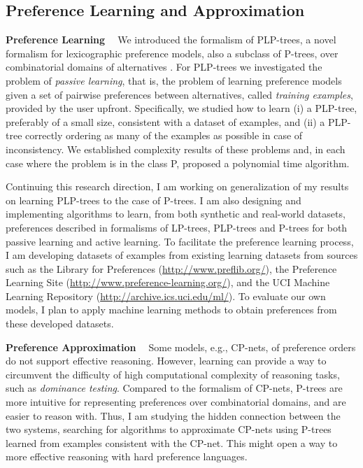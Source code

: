 \documentclass[11pt]{article}
\begin{document}
\subsection{Preference Learning and Approximation}
\smallskip \noindent \textbf{Preference Learning \ }
We introduced the formalism of PLP-trees, a novel formalism for lexicographic preference models,
also a subclass of P-trees, over combinatorial domains of alternatives \cite{LiuT:Learn_PLPTrees}.
For PLP-trees we investigated the problem of \textit{passive learning},
that is, the problem of learning preference models given a set of
pairwise preferences between alternatives, called \textit{training examples}, provided by the user upfront.
Specifically, we studied how to learn (i) a PLP-tree, preferably of a small size, 
consistent with a dataset of examples, and (ii) a PLP-tree correctly
ordering as many of the examples as possible in case
of inconsistency. We established complexity results
of these problems and, in each case where the problem
is in the class P, proposed a polynomial time algorithm.

Continuing this research direction,
I am working on generalization of my results on learning PLP-trees to the case of P-trees.
I am also designing and implementing algorithms to learn, from both synthetic and real-world datasets, preferences
described in formalisms
of LP-trees, PLP-trees and P-trees for both passive learning and active learning.
To facilitate the preference learning process, I am developing datasets of examples from existing
learning datasets from sources such as the Library for Preferences (\url{http://www.preflib.org/}),
the Preference Learning Site (\url{http://www.preference-learning.org/}), 
and the UCI Machine Learning Repository (\url{http://archive.ics.uci.edu/ml/}).
To evaluate our own models, I plan to
apply machine learning methods to obtain preferences from these developed datasets.

\smallskip \noindent \textbf{Preference Approximation \ }
Some models, e.g., CP-nets, of preference orders do not support effective reasoning.
However, learning can provide a way to circumvent the difficulty of high computational complexity
of reasoning tasks, such as \textit{dominance testing}.
Compared to the formalism of CP-nets, P-trees are more intuitive
for representing preferences over combinatorial domains, and are easier to reason with.
Thus, I am studying the hidden connection between the two systems, searching for 
algorithms to approximate
CP-nets using P-trees learned from examples consistent with the CP-net.
This might open a way to more effective reasoning with hard preference languages.
\end{document}
